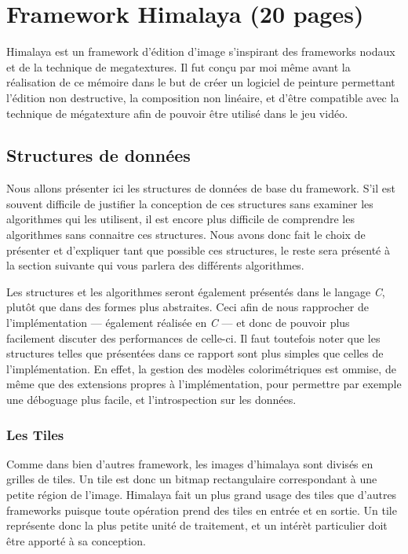 \chapter{Framework Himalaya (20 pages) }
	Himalaya est un framework d'édition d'image s'inspirant des frameworks nodaux et de la technique de megatextures. Il fut conçu par moi même avant la
	réalisation de ce mémoire dans le but de créer un logiciel de peinture permettant l'édition non destructive, la composition non linéaire, et d'être
	compatible avec la technique de mégatexture afin de pouvoir être utilisé dans le jeu vidéo. 


	\section{Structures de données}
		Nous allons présenter ici les structures de données de base du framework. S'il est souvent difficile de justifier la conception de ces structures
		sans examiner les algorithmes qui les utilisent, il est encore plus difficile de comprendre les algorithmes sans connaitre ces structures.
		Nous avons donc fait le choix de présenter et d'expliquer tant que possible ces structures, le reste sera présenté à la section suivante qui
		vous parlera des différents algorithmes.

		Les structures et les algorithmes seront également présentés dans le langage \emph{C}, plutôt que dans des formes plus abstraites. Ceci afin de nous
		rapprocher de l'implémentation --- également réalisée en \emph{C} --- et donc de pouvoir plus facilement discuter des performances de celle-ci. 
		Il faut toutefois noter que les structures telles que présentées dans ce rapport sont plus simples que celles de l'implémentation. En effet, 
		la gestion des modèles colorimétriques est ommise, de même que des extensions propres à l'implémentation, pour permettre par exemple une
		déboguage plus facile, et l'introspection sur les données. 

		\subsection{Les Tiles}
		Comme dans bien d'autres framework, les images d'himalaya sont divisés en grilles de tiles. Un tile est donc un bitmap rectangulaire correspondant
		à une petite région de l'image. Himalaya fait un plus grand usage des tiles que d'autres frameworks puisque toute opération prend des tiles
		en entrée et en sortie. Un tile représente donc la plus petite unité de traitement, et un intérèt particulier doit être apporté à sa conception.

